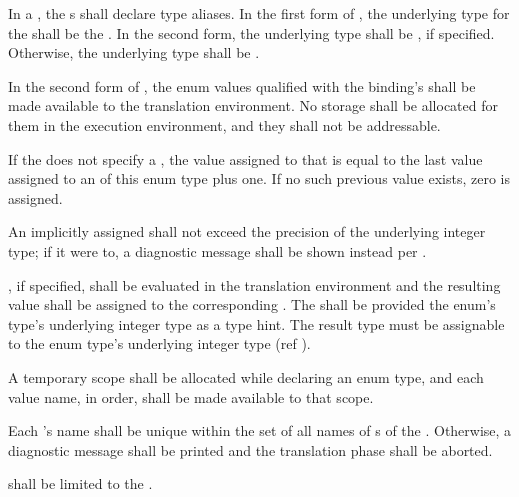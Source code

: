 \specsubsubitem
In a , the s shall
declare type aliases. In the first form of , the
underlying type for the  shall be the
. In the second form, the underlying type shall be
, if specified. Otherwise, the underlying type shall
be .

\specsubsubitem
In the second form of , the enum values qualified
with the binding's  shall be made available to the
translation environment. No storage shall be allocated for them in the
execution environment, and they shall not be addressable.

\specsubsubitem
If the  does not specify a ,
the value assigned to that  is equal to the last value
assigned to an  of this enum type plus one. If no such
previous value exists, zero is assigned.

\specsubsubitem
An implicitly assigned  shall not exceed the precision
of the underlying integer type; if it were to, a diagnostic message shall be
shown instead per .

\specsubsubitem
{}, if specified, shall be evaluated in the translation
environment and the resulting value shall be assigned to the corresponding
. The  shall be provided the
enum's type's underlying integer type as a type hint. The result type must be
assignable to the enum type's underlying integer type (ref
).

\specsubsubitem
A temporary scope shall be allocated while declaring an enum type, and each value
name, in order, shall be made available to that scope.


\specsubsubitem
Each 's name shall be unique within the set of all
names of s of the . Otherwise, a
diagnostic message shall be printed and the translation phase shall be aborted.

\specsubsubitem
{} shall be limited to the
.


